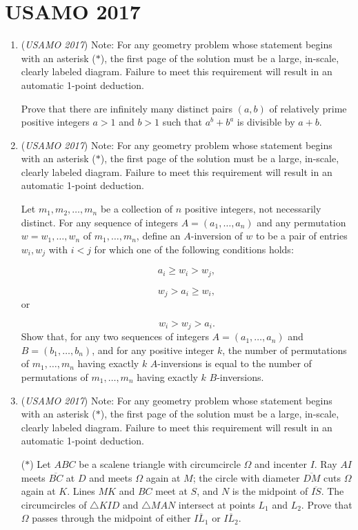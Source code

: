 \section{USAMO 2017}
        \begin{enumerate}
        	\item (\textit{USAMO 2017}) Note: For any geometry problem whose statement begins with an asterisk ($*$), the first page of the solution must be a large, in-scale, clearly labeled diagram. Failure to meet this requirement will result in an automatic 1-point deduction. 


 Prove that there are infinitely many distinct pairs $(a,b)$ of relatively prime positive integers $a > 1$ and $b > 1$ such that $a^b + b^a$ is divisible by $a + b.$


	\item (\textit{USAMO 2017}) Note: For any geometry problem whose statement begins with an asterisk ($*$), the first page of the solution must be a large, in-scale, clearly labeled diagram. Failure to meet this requirement will result in an automatic 1-point deduction. 


 Let $m_1, m_2, \ldots, m_n$ be a collection of $n$ positive integers, not necessarily distinct. For any sequence of integers $A = (a_1, \ldots, a_n)$ and any permutation $w = w_1, \ldots, w_n$ of $m_1, \ldots, m_n$, define an $A$-inversion of $w$ to be a pair of entries $w_i, w_j$ with $i < j$ for which one of the following conditions holds:

 \[a_i \ge w_i > w_j,\]

 \[w_j > a_i \ge w_i,\] or

 \[w_i > w_j > a_i.\]
Show that, for any two sequences of integers $A = (a_1, \ldots, a_n)$ and $B = (b_1, \ldots, b_n)$, and for any positive integer $k$, the number of permutations of $m_1, \ldots, m_n$ having exactly $k$ $A$-inversions is equal to the number of permutations of $m_1, \ldots, m_n$ having exactly $k$ $B$-inversions.


 

	\item (\textit{USAMO 2017}) Note: For any geometry problem whose statement begins with an asterisk ($*$), the first page of the solution must be a large, in-scale, clearly labeled diagram. Failure to meet this requirement will result in an automatic 1-point deduction. 


 ($*$) Let $ABC$ be a scalene triangle with circumcircle $\Omega$ and incenter $I$. Ray $AI$ meets $\overline{BC}$ at $D$ and meets $\Omega$ again at $M$; the circle with diameter $\overline{DM}$ cuts $\Omega$ again at $K$. Lines $MK$ and $BC$ meet at $S$, and $N$ is the midpoint of $\overline{IS}$. The circumcircles of  $\triangle KID$ and $\triangle MAN$ intersect at points $L_1$ and $L_2$. Prove that $\Omega$ passes through the midpoint of either $\overline{IL_1}$ or $\overline{IL_2}$.



\end{enumerate}
